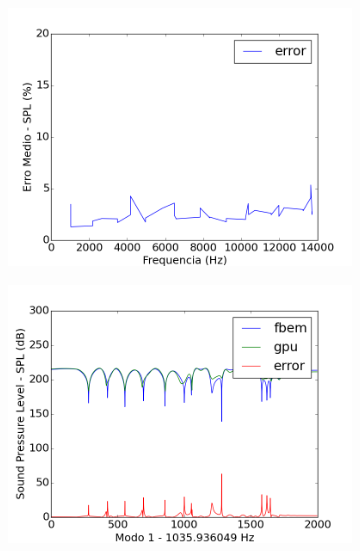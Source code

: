 \begin{figure}[ht]
\centering
\begin{subfigure}{0.6\textwidth}
	\centering
	\includegraphics[width=\textwidth]{../data/transfer_test/ceramic_plate/plots/ceramic_plate_error.png}
	\label{fig:coef_plate_err}
\end{subfigure}
\begin{subfigure}{0.5\textwidth}
	\centering
	\includegraphics[width=\textwidth]{../data/transfer_test/ceramic_plate/plots/ceramic_plate-tfv-0_1.png}
	\label{fig:coef_plate_1}
\end{subfigure}%
\begin{subfigure}{0.5\textwidth}
	\centering

\end{subfigure}
\end{figure}
